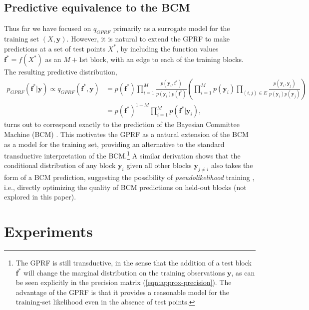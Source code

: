 \documentclass{article}
\renewcommand{\v}[1]{\mathbf{#1}}
\begin{document}
\subsection{Predictive equivalence to the BCM}
\label{sec:approx-predict}
\vspace{-.2cm}
Thus far we have focused on $q_{GPRF}$ primarily as a surrogate model
for the training set $(X, \v{y})$.  However, it is natural to extend
the GPRF to make predictions at a set of test points $X^*$, by including the
function values $\v{f}^* = f(X^*)$ as an $M+1$st block, with an edge to each of the training blocks. The resulting
predictive distribution,
\begin{align}
p_{GPRF}(\v{f}^* | \v{y}) \propto q_{GPRF}(\v{f}^*, \v{y}) 
&= p(\v{f}^*) \prod_{i=1}^M \frac{p(\v{y}_i,
  \v{f}^*)}{p(\v{y}_i) p(\v{f}^*)} \left(\prod_{i=1}^M p(\v{y}_i) \prod_{(i,j)\in E} \frac{p(\v{y}_i, \v{y}_j)}{p(\v{y}_i)
    p(\v{y}_j)}\right)  \nonumber \\
&=p(\v{f}^*)^{1-M} \prod_{i=1}^M p(\v{f}^* | \v{y}_i),
\end{align}
turns out to correspond exactly to the prediction of 
the Bayesian Committee Machine (BCM) \citep{tresp2000bayesian}. This motivates the
GPRF as a natural extension of the BCM as a model for the training
set, providing an alternative to the standard transductive
interpretation of the BCM.\footnote{The GPRF is still transductive, in
  the sense that the addition of a test block $\v{f^*}$ will change the
  marginal distribution on the training observations $\v{y}$, as 
  can be seen explicitly in the precision matrix (\ref{eqn:approx-precision}). The
  advantage of the GPRF is that it provides a reasonable model for
  the training-set likelihood even in the absence of test
  points. } A similar derivation shows that the conditional distribution of any
block $\v{y}_i$ given all other blocks $\v{y}_{j\ne i}$ also takes the
form of a BCM prediction, suggesting the possibility of
{\em pseudolikelihood} training \cite{besag1975statistical}, i.e.,
directly optimizing the quality of BCM predictions on held-out blocks
(not explored in this paper).
\vspace{-.2cm}
\section{Experiments}
\vspace{-.2cm}
\end{document}
